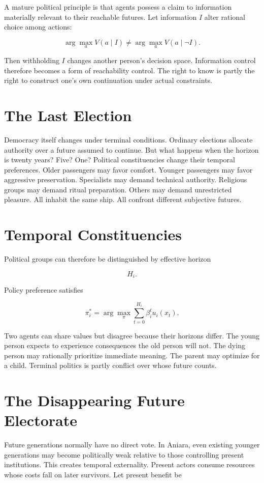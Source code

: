 \documentclass[11pt,oneside]{book}
\theoremstyle{definition}
\theoremstyle{remark}
\begin{document}
A mature political principle is that agents possess a claim to information materially relevant to
their reachable futures. Let information \(I\) alter rational choice among actions:

\[
\arg\max_a V(a\mid I) \neq \arg\max_a V(a\mid\neg I).
\]

Then withholding \(I\) changes another person's decision space. Information control therefore
becomes a form of reachability control. The right to know is partly the right to construct one's own
continuation under actual constraints.

\section{The Last Election}

Democracy itself changes under terminal conditions. Ordinary elections allocate authority over a
future assumed to continue. But what happens when the horizon is twenty years? Five? One? Political
constituencies change their temporal preferences. Older passengers may favor comfort. Younger
passengers may favor aggressive preservation. Specialists may demand technical authority. Religious
groups may demand ritual preparation. Others may demand unrestricted pleasure. All inhabit the same
ship. All confront different subjective futures.

\section{Temporal Constituencies}

Political groups can therefore be distinguished by effective horizon

\[
H_i.
\]

Policy preference satisfies

\[
\pi_i^\ast = \arg\max_\pi \sum_{t=0}^{H_i} \beta_i^t u_i(x_t).
\]

Two agents can share values but disagree because their horizons differ. The young person expects to
experience consequences the old person will not. The dying person may rationally prioritize
immediate meaning. The parent may optimize for a child. Terminal politics is partly conflict over
whose future counts.

\section{The Disappearing Future Electorate}

Future generations normally have no direct vote. In Aniara, even existing younger generations may
become politically weak relative to those controlling present institutions. This creates temporal
externality. Present actors consume resources whose costs fall on later survivors. Let present
benefit be
\end{document}
